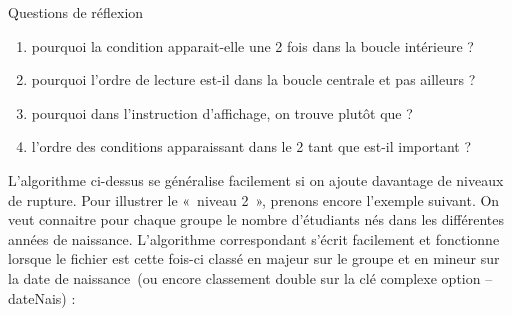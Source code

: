 
\begin{Emphase}[reflexion]{Questions de réflexion}
\begin{enumerate}
	\item 
		pourquoi la condition 
		apparait-elle une 2 fois dans la boucle 
		intérieure ?
	\item 
		pourquoi l’ordre de lecture est-il dans la boucle centrale et pas
		ailleurs ?
	\item 
		pourquoi dans l’instruction d'affichage, on trouve
		 plutôt que  ?
	\item 
		l’ordre des conditions apparaissant dans le 2 tant
		que est-il important ?
\end{enumerate}
\end{Emphase}

L’algorithme ci-dessus se généralise facilement si on ajoute davantage
de niveaux de rupture. Pour illustrer le «~niveau 2~», prenons encore
l’exemple suivant. On veut connaitre pour chaque groupe le nombre
d’étudiants nés dans les différentes années de naissance. L’algorithme
correspondant s’écrit facilement et fonctionne lorsque le fichier est
cette fois-ci classé en majeur sur le groupe et en mineur sur la date
de naissance~(ou encore classement double sur la clé complexe option –
dateNais) :

